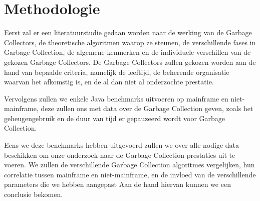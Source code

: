 




\section{Methodologie}%
\label{sec:methodologie}


Eerst zal er een literatuurstudie gedaan worden naar de werking van de Garbage Collectors, de theoretische algoritmen waarop ze steunen, de verschillende fases in Garbage Collection, de algemene kenmerken en de individuele verschillen van de gekozen Garbage Collectors.
De Garbage Collectors zullen gekozen worden aan de hand van bepaalde criteria, namelijk de leeftijd, de beherende organisatie waarvan het afkomstig is, en de al dan niet al onderzochte prestatie.

Vervolgens zullen we enkele Java benchmarks uitvoeren op mainframe en niet-mainframe, deze zullen ons met data over de Garbage Collection geven, zoals het geheugengebruik en de duur van tijd er gepauzeerd wordt voor Garbage Collection.

Eens we deze benchmarks hebben uitgevoerd zullen we over alle nodige data beschikken om onze onderzoek naar de Garbage Collection prestaties uit te voeren.
We zullen de verschillende Garbage Collection algoritmes vergelijken, hun correlatie tussen mainframe en niet-mainframe, en de invloed van de verschillende parameters die we hebben aangepast
Aan de hand hiervan kunnen we een conclusie bekomen.


